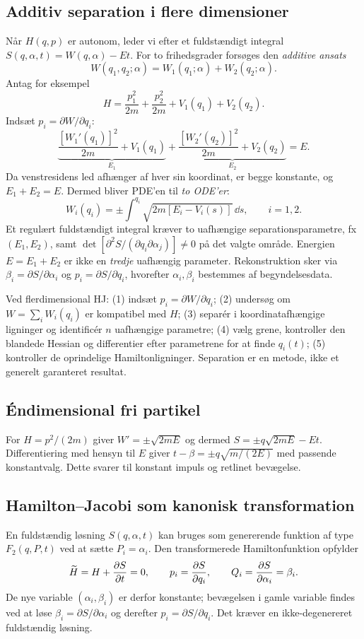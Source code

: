 \subsection{Additiv separation i flere dimensioner}
Når $H(q,p)$ er autonom, leder vi efter et fuldstændigt integral
$S(q,\alpha,t)=W(q,\alpha)-Et$. For to frihedsgrader forsøges den \emph{additive ansats}
\[
W(q_1,q_2;\alpha)=W_1(q_1;\alpha)+W_2(q_2;\alpha).
\]
Antag for eksempel
\[
H=\frac{p_1^2}{2m}+\frac{p_2^2}{2m}+V_1(q_1)+V_2(q_2).
\]
Indsæt $p_i=\partial W/\partial q_i$:
\[
\underbrace{\frac{[W_1'(q_1)]^2}{2m}+V_1(q_1)}_{E_1}
+\underbrace{\frac{[W_2'(q_2)]^2}{2m}+V_2(q_2)}_{E_2}
=E.
\]
Da venstresidens led afhænger af hver sin koordinat, er begge konstante, og $E_1+E_2=E$. Dermed bliver PDE'en til \emph{to ODE'er}:
\[
W_i(q_i)=\pm\int^{q_i}\sqrt{2m[E_i-V_i(s)]}\,\dd s,\qquad i=1,2.
\]
Et regulært fuldstændigt integral kræver to uafhængige separationsparametre, fx $(E_1,E_2)$, samt
$\det[\partial^2S/(\partial q_i\partial\alpha_j)]\ne0$ på det valgte område. Energien $E=E_1+E_2$ er ikke en \emph{tredje} uafhængig parameter. Rekonstruktion sker via
$\beta_i=\partial S/\partial\alpha_i$ og $p_i=\partial S/\partial q_i$, hvorefter $\alpha_i,\beta_i$ bestemmes af begyndelsesdata.
\begin{method}Ved flerdimensional HJ: (1) indsæt $p_i=\partial W/\partial q_i$; (2) undersøg om $W=\sum_iW_i(q_i)$ er kompatibel med $H$; (3) separér i koordinatafhængige ligninger og identificér $n$ uafhængige parametre; (4) vælg grene, kontroller den blandede Hessian og differentier efter parametrene for at finde $q_i(t)$; (5) kontroller de oprindelige Hamiltonligninger. Separation er en metode, ikke et generelt garanteret resultat.\end{method}

\subsection{Éndimensional fri partikel}
For $H=p^2/(2m)$ giver $W'=\pm\sqrt{2mE}$ og dermed $S=\pm q\sqrt{2mE}-Et$. Differentiering med hensyn til $E$ giver $t-\beta=\pm q\sqrt{m/(2E)}$ med passende konstantvalg. Dette svarer til konstant impuls og retlinet bevægelse.

\subsection{Hamilton--Jacobi som kanonisk transformation}
En fuldstændig løsning $S(q,\alpha,t)$ kan bruges som genererende funktion af type $F_2(q,P,t)$ ved at sætte $P_i=\alpha_i$. Den transformerede Hamiltonfunktion opfylder
\[\widetilde H=H+\frac{\partial S}{\partial t}=0,\qquad p_i=\frac{\partial S}{\partial q_i},\qquad Q_i=\frac{\partial S}{\partial \alpha_i}=\beta_i.\]
De nye variable $(\alpha_i,\beta_i)$ er derfor konstante; bevægelsen i gamle variable findes ved at løse $\beta_i=\partial S/\partial\alpha_i$ og derefter $p_i=\partial S/\partial q_i$. Det kræver en ikke-degenereret fuldstændig løsning.
